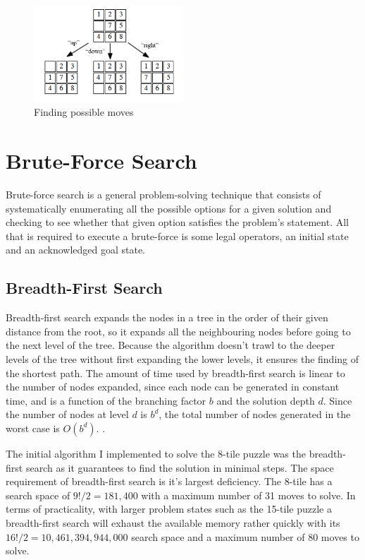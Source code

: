 \documentclass[final]{cmpreport}
\begin{document}
\begin{figure}[ht]
	\centering
	\includegraphics[width=0.5\textwidth]{moves}
	\captionsetup{justification=centering}
	\caption{Finding possible moves}
\end{figure}


\section{Brute-Force Search}
Brute-force search is a general problem-solving technique that consists of systematically enumerating all the possible options for a given solution and checking to see whether that given option satisfies the problem's statement. All that is required to execute a brute-force is some legal operators, an initial state and an acknowledged goal state. 

\subsection{Breadth-First Search}
Breadth-first search expands the nodes in a tree in the order of their given distance from the root, so it expands all the neighbouring nodes before going to the next level of the tree. Because the algorithm doesn't trawl to the deeper levels of the tree without first expanding the lower levels, it ensures the finding of the shortest path. The amount of time used by breadth-first search is linear to the number of nodes expanded, since each node can be generated in constant time, and is a function of the branching factor $b$ and the solution depth $d$. Since the number of nodes at level $d$ is $b^d$, the total number of nodes generated in the worst case is $O(b^d)$. \citep{DBLP:journals/mima/Korf95}.

The initial algorithm I implemented to solve the 8-tile puzzle was the breadth-first search as it guarantees to find the solution in minimal steps. The space requirement of breadth-first search is it's largest deficiency. The 8-tile has a search space of $9!/2=181,400$ with a maximum number of 31 moves to solve. In terms of practicality, with larger problem states such as the 15-tile puzzle a breadth-first search will exhaust the available memory rather quickly with its $16!/2 = 10,461,394,944,000$ search space and a maximum number of 80 moves to solve.
\end{document}
